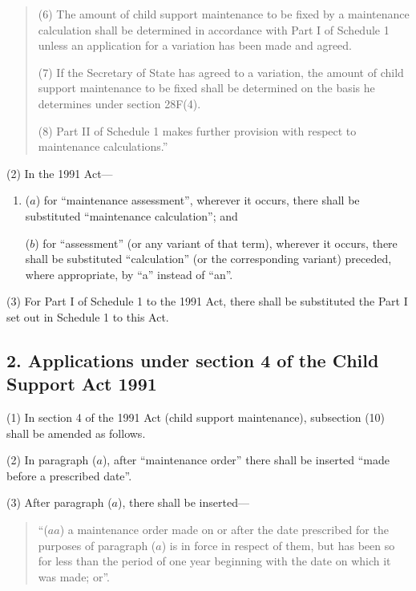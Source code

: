 \documentclass[12pt,a4paper]{article}
\begin{document}
\begin{quotation}
(6) The amount of child support maintenance to be fixed by a maintenance calculation shall be determined in accordance with Part I of Schedule 1 unless an application for a variation has been made and agreed.

(7) If the Secretary of State has agreed to a variation, the amount of child support maintenance to be fixed shall be determined on the basis he determines under section 28F(4).

(8) Part II of Schedule 1 makes further provision with respect to maintenance calculations.”
\end{quotation}

(2) In the 1991 Act—
\begin{enumerate}\item[]
($a$) for “maintenance assessment”, wherever it occurs, there shall be substituted “maintenance calculation”; and

($b$) for “assessment” (or any variant of that term), wherever it occurs, there shall be substituted “calculation” (or the corresponding variant) preceded, where appropriate, by “a” instead of “an”.
\end{enumerate}

(3) For Part I of Schedule 1 to the 1991 Act, there shall be substituted the Part I set out in Schedule 1 to this Act.



\subsection{2. Applications under section 4 of the Child Support Act 1991}

(1) In section 4 of the 1991 Act (child support maintenance), subsection (10)  shall be amended as follows.

(2) In paragraph ($a$), after “maintenance order” there shall be inserted “made before a prescribed date”.

(3) After paragraph ($a$), there shall be inserted—
\begin{quotation}
“($aa$) a maintenance order made on or after the date prescribed for the purposes of paragraph ($a$)  is in force in respect of them, but has been so for less than the period of one year beginning with the date on which it was made; or”.
\end{quotation}
\end{document}
